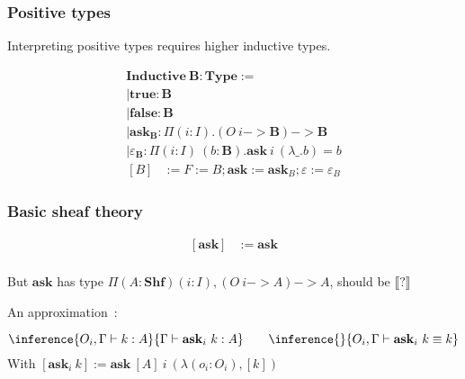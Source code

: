 \documentclass{beamer}
\newcommand{\0}{\boldsymbol{0}}
\newcommand{\1}{\boldsymbol{1}}
\begin{document}
\begin{frame}
    \frametitle{Positive types}
    Interpreting positive types requires higher inductive types.
    
$$
\begin{array}{l}
    \mathbf{Inductive}\ \mathbf{B} : \mathbf{Type} := \\
    \mid \mathbf{true} : \mathbf{B}\\
    \mid \mathbf{false} : \mathbf{B}\\
    \mid \mathbf{ask}_{\mathbf{B}} : \Pi (i:I). (O\ i -> \mathbf{B}) -> \mathbf{B}\\
    \mid \varepsilon_\mathbf{B} : \Pi (i:I)\ (b : \mathbf B). \mathbf{ask}\ i\ (\lambda \_. b) = b
\end{array}
$$
$$
\begin{array}{rl}
    [B] &:={F:= B; \mathbf{ask}:=\mathbf{ask}_B;\varepsilon := \varepsilon_B}
\end{array}
$$

\end{frame}

\begin{frame}
    \frametitle{Basic sheaf theory}

    $$\begin{array}{rl}
        [\mathbf{ask}] &:= \mathbf{ask}\\
    \end{array}$$

    But $\mathbf{ask}$ has type  $\Pi (A : \mathbf{Shf}) (i:I), (O\ i -> A ) -> A$, should be $\llbracket ? \rrbracket$
    \vspace{1cm}

    An approximation~:

    $$\inference{O_i,\Gamma\vdash k : A}{\Gamma\vdash \mathbf{ask}_i\ k : A}\qquad \inference{}{O_i,\Gamma\vdash \mathbf{ask}_i\ k \equiv k}$$
    With $[\mathbf{ask}_i\ k] := \mathbf{ask}\ [A]\ i\ (\lambda (o_i: O_i), [k])$
\end{frame}
\end{document}
